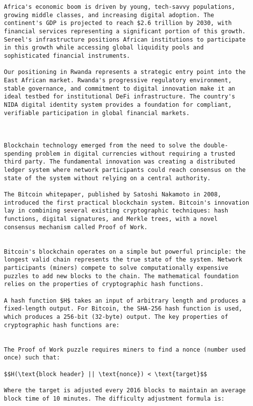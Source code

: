 \documentclass[12pt]{article}
\begin{document}
{{{\begin{itemize}
\begin{lstlisting}
Africa's economic boom is driven by young, tech-savvy populations, growing middle classes, and increasing digital adoption. The continent's GDP is projected to reach $2.6 trillion by 2030, with financial services representing a significant portion of this growth. Sereel's infrastructure positions African institutions to participate in this growth while accessing global liquidity pools and sophisticated financial instruments.

Our positioning in Rwanda represents a strategic entry point into the East African market. Rwanda's progressive regulatory environment, stable governance, and commitment to digital innovation make it an ideal testbed for institutional DeFi infrastructure. The country's NIDA digital identity system provides a foundation for compliant, verifiable participation in global financial markets.



Blockchain technology emerged from the need to solve the double-spending problem in digital currencies without requiring a trusted third party. The fundamental innovation was creating a distributed ledger system where network participants could reach consensus on the state of the system without relying on a central authority.

The Bitcoin whitepaper, published by Satoshi Nakamoto in 2008, introduced the first practical blockchain system. Bitcoin's innovation lay in combining several existing cryptographic techniques: hash functions, digital signatures, and Merkle trees, with a novel consensus mechanism called Proof of Work.


Bitcoin's blockchain operates on a simple but powerful principle: the longest valid chain represents the true state of the system. Network participants (miners) compete to solve computationally expensive puzzles to add new blocks to the chain. The mathematical foundation relies on the properties of cryptographic hash functions.

A hash function $H$ takes an input of arbitrary length and produces a fixed-length output. For Bitcoin, the SHA-256 hash function is used, which produces a 256-bit (32-byte) output. The key properties of cryptographic hash functions are:


The Proof of Work puzzle requires miners to find a nonce (number used once) such that:

$$H(\text{block header} || \text{nonce}) < \text{target}$$

Where the target is adjusted every 2016 blocks to maintain an average block time of 10 minutes. The difficulty adjustment formula is:


\end{lstlisting}
\end{itemize}}}}
\end{document}
